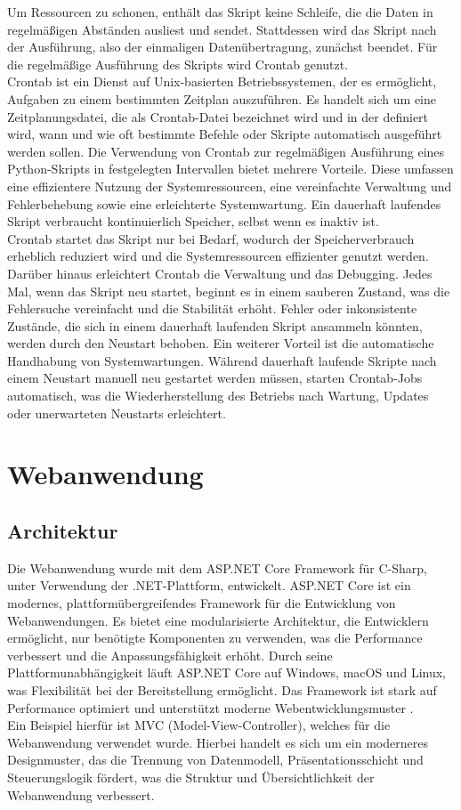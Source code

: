 \documentclass[conference]{IEEEtran}
\begin{document}
Um Ressourcen zu schonen, enthält das Skript keine Schleife, die die Daten in regelmäßigen Abständen ausliest und sendet. Stattdessen wird das Skript nach der Ausführung, also der einmaligen Datenübertragung, zunächst beendet. Für die regelmäßige Ausführung des Skripts wird Crontab genutzt. \\ 
Crontab ist ein Dienst auf Unix-basierten Betriebssystemen, der es ermöglicht, Aufgaben zu einem bestimmten Zeitplan auszuführen. Es handelt sich um eine Zeitplanungsdatei, die als Crontab-Datei bezeichnet wird und in der definiert wird, wann und wie oft bestimmte Befehle oder Skripte automatisch ausgeführt werden sollen. Die Verwendung von Crontab zur regelmäßigen Ausführung eines Python-Skripts in festgelegten Intervallen bietet mehrere Vorteile. Diese umfassen eine effizientere Nutzung der Systemressourcen, eine vereinfachte Verwaltung und Fehlerbehebung sowie eine erleichterte Systemwartung. Ein dauerhaft laufendes Skript verbraucht kontinuierlich Speicher, selbst wenn es inaktiv ist. \\
Crontab startet das Skript nur bei Bedarf, wodurch der Speicherverbrauch erheblich reduziert wird und die Systemressourcen effizienter genutzt werden. Darüber hinaus erleichtert Crontab die Verwaltung und das Debugging. Jedes Mal, wenn das Skript neu startet, beginnt es in einem sauberen Zustand, was die Fehlersuche vereinfacht und die Stabilität erhöht. Fehler oder inkonsistente Zustände, die sich in einem dauerhaft laufenden Skript ansammeln könnten, werden durch den Neustart behoben. Ein weiterer Vorteil ist die automatische Handhabung von Systemwartungen. Während dauerhaft laufende Skripte nach einem Neustart manuell neu gestartet werden müssen, starten Crontab-Jobs automatisch, was die Wiederherstellung des Betriebs nach Wartung, Updates oder unerwarteten Neustarts erleichtert.

\section{Webanwendung}
\subsection{Architektur}
Die Webanwendung wurde mit dem ASP.NET Core Framework für C-Sharp, unter Verwendung der .NET-Plattform, entwickelt. ASP.NET Core ist ein modernes, plattformübergreifendes Framework für die Entwicklung von Webanwendungen. Es bietet eine modularisierte Architektur, die Entwicklern ermöglicht, nur benötigte Komponenten zu verwenden, was die Performance verbessert und die Anpassungsfähigkeit erhöht. Durch seine Plattformunabhängigkeit läuft ASP.NET Core auf Windows, macOS und Linux, was Flexibilität bei der Bereitstellung ermöglicht. Das Framework ist stark auf Performance optimiert und unterstützt moderne Webentwicklungsmuster \cite{dotNET} \cite{csharp}. \\
Ein Beispiel hierfür ist MVC (Model-View-Controller), welches für die Webanwendung verwendet wurde. Hierbei handelt es sich um ein moderneres Designmuster, das die Trennung von Datenmodell, Präsentationsschicht und Steuerungslogik fördert, was die Struktur und Übersichtlichkeit der Webanwendung verbessert.
\end{document}
